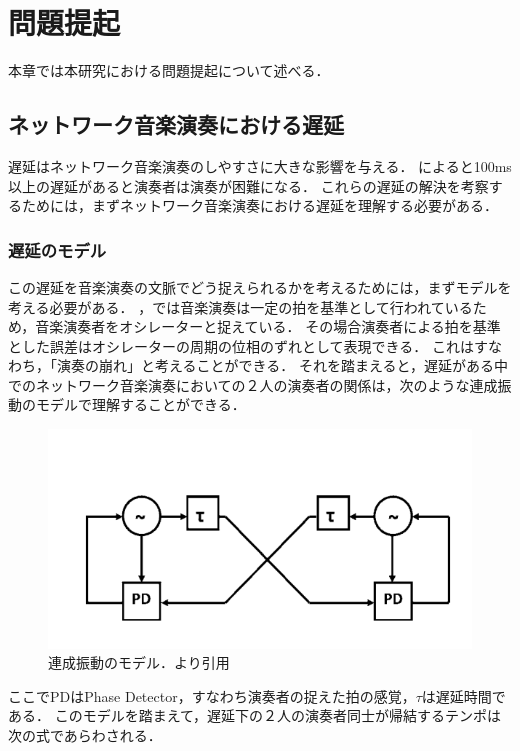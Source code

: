 \chapter{問題提起}
\label{related}

本章では本研究における問題提起について述べる．

\section{ネットワーク音楽演奏における遅延}
遅延はネットワーク音楽演奏のしやすさに大きな影響を与える．
\cite{latency:effect}によると100ms以上の遅延があると演奏者は演奏が困難になる．
これらの遅延の解決を考察するためには，まずネットワーク音楽演奏における遅延を理解する必要がある．

\subsection{遅延のモデル}
この遅延を音楽演奏の文脈でどう捉えられるかを考えるためには，まずモデルを考える必要がある．
\cite{nmp:overview}，\cite{latency:model}では音楽演奏は一定の拍を基準として行われているため，音楽演奏者をオシレーターと捉えている．
その場合演奏者による拍を基準とした誤差はオシレーターの周期の位相のずれとして表現できる．
これはすなわち，「演奏の崩れ」と考えることができる．
それを踏まえると，遅延がある中でのネットワーク音楽演奏においての２人の演奏者の関係は，次のような連成振動のモデルで理解することができる．

\begin{figure}
  \centering
  \includegraphics[width=0.8\linewidth]{src/latencymodel.png}
  \caption{連成振動のモデル．\cite{latency:model}より引用}
  \label{fig:oscillator}
\end{figure}

ここでPDはPhase Detector，すなわち演奏者の捉えた拍の感覚，\begin{math}\tau\end{math}は遅延時間である．
このモデルを踏まえて，遅延下の２人の演奏者同士が帰結するテンポは次の式であらわされる．

